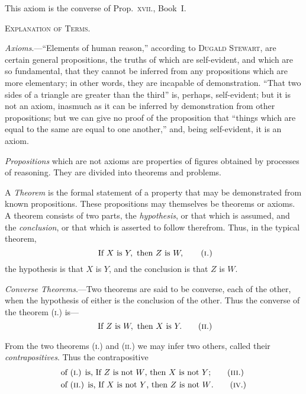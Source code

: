 \documentclass[oneside]{book}
\newcommand\imgcent[2]{
\begin{center}
\end{center}
}
\begin{document}
\imgcent{132}{f011}

This axiom is the converse of Prop.~\textsc{xvii}., Book~I.


\begin{center}
\textsc{Explanation of Terms.}
\end{center}

\emph{Axioms}.---``Elements of human reason,'' according to
\textsc{Dugald Stewart}, are certain general propositions, the
truths of which are self-evident, and which are so fundamental,
that they cannot be inferred from any propositions
which are more elementary; in other words,
they are incapable of demonstration. ``That two sides
of a triangle are greater than the third'' is, perhaps,
self-evident; but it is not an axiom, inasmuch as it can
be inferred by demonstration from other propositions;
but we can give no proof of the proposition that
``things which are equal to the same are equal to one
another,'' and, being self-evident, it is an axiom.

\emph{Propositions} which are not axioms are properties of
figures obtained by processes of reasoning. They are
divided into theorems and problems.

A \emph{Theorem} is the formal statement of a property that
may be demonstrated from known propositions. These
propositions may themselves be theorems or axioms. A
theorem consists of two parts, the \emph{hypothesis}, or that
which is assumed, and the \emph{conclusion}, or that which is
asserted to follow therefrom. Thus, in the typical
theorem,
\[
  \text{\ If } X \text{\ is } Y,\text{\ then }Z \text{\ is } W,
\tag{\textsc{i.}}
\]
the hypothesis is that $X$ is $Y$, and the conclusion is
that $Z$ is $W$.

\emph{Converse Theorems}.---Two theorems are said to be
converse, each of the other, when the hypothesis of
either is the conclusion of the other. Thus the converse
of the theorem (\textsc{i}.) is---
\[
  \text{\ If } Z \text{\ is } W, \text{\ then } X \text{\ is } Y.
\tag{\textsc{ii}.}
\]

From the two theorems (\textsc{i.}) and (\textsc{ii.}) we may infer
two others, called their \emph{contrapositives}. Thus the contrapositive
\begin{align*}
&\text{of (\textsc{i}.) is, If $Z$ is not $W$, then $X$ is not $Y$;} \tag{\textsc{iii}.}
\\
&\text{of (\textsc{ii}.) is, If $X$ is not $Y$, then $Z$ is not $W$.} \tag{\textsc{iv}.}
\end{align*}
\end{document}
